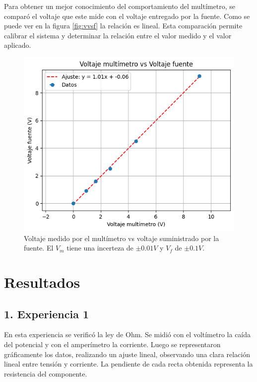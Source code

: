 \documentclass[11pt]{article}
\begin{document}
Para obtener un mejor conocimiento del comportamiento del multímetro, se comparó el voltaje que este mide con el voltaje entregado por la fuente. Como se puede ver en la figura \ref{fig:vvsf} la relación es lineal. Esta comparación permite calibrar el sistema y determinar la relación entre el valor medido y el valor aplicado.

\begin{figure}[H]
    \centering
    \includegraphics[width=.9\linewidth]{VvsV.png}
    \caption{Voltaje medido por el multímetro vs voltaje suministrado por la fuente. El $V_m$ tiene una incerteza de $\pm 0.01V$ y $V_f$ de $\pm0.1V$.}
    \label{fig:VvsV}
\end{figure}

\section*{Resultados}

\subsection*{1. Experiencia 1}

En esta experiencia se verificó la ley de Ohm. Se midió con el voltímetro la caída del potencial y con el amperímetro la corriente. Luego se representaron gráficamente los datos, realizando un ajuste lineal, observando una clara relación lineal entre tensión y corriente. La pendiente de cada recta obtenida representa la resistencia del componente.
\end{document}
